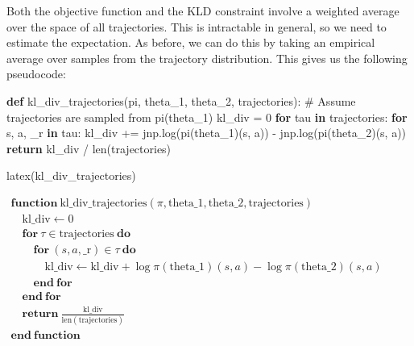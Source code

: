 \documentclass[
  letterpaper,
  DIV=11,
  numbers=noendperiod]{scrreprt}
\newenvironment{Shaded}{\begin{snugshade}}{\end{snugshade}}
\newcommand{\BuiltInTok}[1]{\textcolor[rgb]{0.00,0.23,0.31}{#1}}
\newcommand{\CommentTok}[1]{\textcolor[rgb]{0.37,0.37,0.37}{#1}}
\newcommand{\ControlFlowTok}[1]{\textcolor[rgb]{0.00,0.23,0.31}{\textbf{#1}}}
\newcommand{\DecValTok}[1]{\textcolor[rgb]{0.68,0.00,0.00}{#1}}
\newcommand{\KeywordTok}[1]{\textcolor[rgb]{0.00,0.23,0.31}{\textbf{#1}}}
\newcommand{\NormalTok}[1]{\textcolor[rgb]{0.00,0.23,0.31}{#1}}
\newcommand{\OperatorTok}[1]{\textcolor[rgb]{0.37,0.37,0.37}{#1}}
\theoremstyle{plain}
\theoremstyle{plain}
\theoremstyle{definition}
\theoremstyle{definition}
\theoremstyle{remark}
\begin{document}
Both the objective function and the KLD constraint involve a weighted
average over the space of all trajectories. This is intractable in
general, so we need to estimate the expectation. As before, we can do
this by taking an empirical average over samples from the trajectory
distribution. This gives us the following pseudocode:

\begin{Shaded}
\begin{Highlighting}[]
\KeywordTok{def}\NormalTok{ kl\_div\_trajectories(pi, theta\_1, theta\_2, trajectories):}
    \CommentTok{\# Assume trajectories are sampled from pi(theta\_1)}
\NormalTok{    kl\_div }\OperatorTok{=} \DecValTok{0}
    \ControlFlowTok{for}\NormalTok{ tau }\KeywordTok{in}\NormalTok{ trajectories:}
        \ControlFlowTok{for}\NormalTok{ s, a, \_r }\KeywordTok{in}\NormalTok{ tau:}
\NormalTok{            kl\_div }\OperatorTok{+=}\NormalTok{ jnp.log(pi(theta\_1)(s, a)) }\OperatorTok{{-}}\NormalTok{ jnp.log(pi(theta\_2)(s, a))}
    \ControlFlowTok{return}\NormalTok{ kl\_div }\OperatorTok{/} \BuiltInTok{len}\NormalTok{(trajectories)}

\NormalTok{latex(kl\_div\_trajectories)}
\end{Highlighting}
\end{Shaded}

$ \begin{array}{l} \mathbf{function} \ \mathrm{kl\_div\_trajectories}(\pi, \mathrm{theta\_1}, \mathrm{theta\_2}, \mathrm{trajectories}) \\ \hspace{1em} \mathrm{kl\_div} \gets 0 \\ \hspace{1em} \mathbf{for} \ \tau \in \mathrm{trajectories} \ \mathbf{do} \\ \hspace{2em} \mathbf{for} \ \mathopen{}\left( s, a, \mathrm{\_r} \mathclose{}\right) \in \tau \ \mathbf{do} \\ \hspace{3em} \mathrm{kl\_div} \gets \mathrm{kl\_div} + \log \pi \mathopen{}\left( \mathrm{theta\_1} \mathclose{}\right) \mathopen{}\left( s, a \mathclose{}\right) - \log \pi \mathopen{}\left( \mathrm{theta\_2} \mathclose{}\right) \mathopen{}\left( s, a \mathclose{}\right) \\ \hspace{2em} \mathbf{end \ for} \\ \hspace{1em} \mathbf{end \ for} \\ \hspace{1em} \mathbf{return} \ \frac{\mathrm{kl\_div}}{\mathrm{len} \mathopen{}\left( \mathrm{trajectories} \mathclose{}\right)} \\ \mathbf{end \ function} \end{array} $
\end{document}
